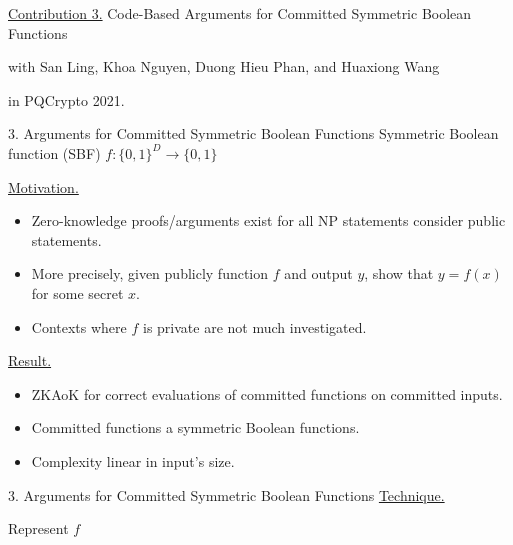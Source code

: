 \begin{frame}
	\underline{Contribution 3.} Code-Based Arguments for Committed Symmetric Boolean Functions
	
	{\small with San Ling, Khoa Nguyen, Duong Hieu Phan, and Huaxiong Wang}
	
	in PQCrypto 2021.
\end{frame}

\begin{frame}{3. Arguments for Committed Symmetric Boolean Functions}
	Symmetric Boolean function (SBF) $f : \{0,1\}^D \to \{0,1\}$
	
	\underline{Motivation.} 
	\begin{itemize}
		\item Zero-knowledge proofs/arguments exist for all NP statements consider public statements.
		\item More precisely, given publicly function $f$ and output $y$, show that $y = f(x)$ for some secret $x$.
		\item Contexts where $f$ is private are not much investigated.
	\end{itemize}
	\underline{Result.}
	\begin{itemize}
		\item ZKAoK for correct evaluations of committed functions on committed inputs.
		\item Committed functions a symmetric Boolean functions.
		\item Complexity linear in input's size.
	\end{itemize}
\end{frame}

\begin{frame}{3. Arguments for Committed Symmetric Boolean Functions}
	\underline{Technique.}
	
	Represent $f$
\end{frame}